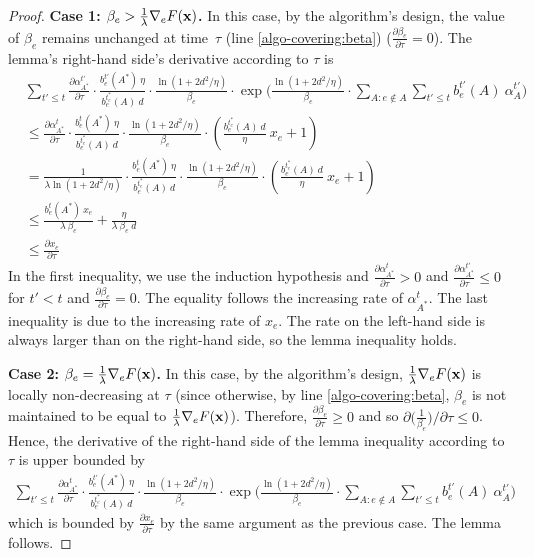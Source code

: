 \begin{proof}
	\textbf{Case 1: $\beta_{e} > \frac{1}{\lambda} \nabla_{e} F(\mathbf{x})$.}
	In this case, by the algorithm's design, the value of $\beta_{e}$ remains unchanged at time~$\tau$ (line \ref{algo-covering:beta}) ($\frac{\partial \beta_{e}}{\partial \tau} = 0$).
	The lemma's right-hand side's derivative according to $\tau$ is
	\begin{align*}
	&\sum_{t' \le t} \frac{\partial \alpha^{t'}_{A^{*}}}{\partial \tau} \cdot
		\frac{b^{t'}_{e}(A^{*}) \ \eta }{b^{t_{e}^{*}}_{e}(A) \ d} \cdot \frac{\ln(1+2d^{2}/\eta)}{\beta_{e}}
			\cdot \exp\biggl( \frac{\ln(1+2d^{2}/\eta)}{\beta_{e} } \cdot \sum_{A: e \notin A} \sum_{t' \le t} b^{t'}_{e}(A)\ \alpha^{t'}_{A} \biggr) \\
	&\leq \frac{\partial \alpha^{t}_{A^{*}}}{\partial \tau} \cdot
		\frac{b^{t}_{e}(A^{*}) \ \eta }{b^{t_{e}^{*}}_{e}(A) \ d} \cdot \frac{\ln(1+2d^{2}/\eta)}{\beta_{e}} \cdot \left( \frac{b^{t_{e}^{*}}_{e}(A) \ d}{\eta}\ x_{e} + 1 \right) \\
	&= \frac{1}{\lambda \ln(1+2d^{2}/\eta)} \cdot
		\frac{b^{t}_{e}(A^{*}) \ \eta }{b^{t_{e}^{*}}_{e}(A) \ d} \cdot \frac{\ln(1+2d^{2}/\eta)}{\beta_{e}} \cdot \left( \frac{b^{t_{e}^{*}}_{e}(A) \ d}{\eta}\ x_{e} + 1 \right) \\
	&\leq  \frac{b^{t}_{e}(A^{*}) \ x_{e}}{\lambda\ \beta_{e}} + \frac{\eta}{\lambda\ \beta_{e}\ d} \\
	&\leq \frac{\partial x_{e}}{\partial \tau}
	\end{align*}
	In the first inequality, we use the induction hypothesis and $\frac{\partial \alpha^{t}_{A^{*}}}{\partial \tau} > 0$
	and $\frac{\partial \alpha^{t'}_{A^{*}}}{\partial \tau} \leq 0$ for $t' < t$ and $\frac{\partial \beta_{e}}{\partial \tau} = 0$.
	The equality follows the increasing rate of $\alpha^{t}_{A^{*}}$.
	The last inequality is due to the increasing rate of $x_{e}$.
	The rate on the left-hand side is always larger than on the right-hand side, so the lemma inequality holds.

	\textbf{Case 2: $\beta_{e} = \frac{1}{\lambda} \nabla_{e} F(\mathbf{x})$.}
	In this case, by the algorithm's design, $\frac{1}{\lambda} \nabla_{e} F(\mathbf{x})$ is locally non-decreasing at $\tau$ (since otherwise,
	by line \ref{algo-covering:beta}, $\beta_{e}$ is not maintained to be equal to $\frac{1}{\lambda} \nabla_{e} F(\mathbf{x})$).
	Therefore, $\frac{\partial \beta_{e}}{\partial \tau} \geq 0$ and so $\partial \bigl(\frac{1}{\beta_{e}}\bigr)/\partial \tau \leq 0$.
	Hence, the derivative of the right-hand side of the lemma inequality according to $\tau$ is upper bounded by
	\begin{align*}
	\sum_{t' \le t} \frac{\partial \alpha^{t}_{A^{*}}}{\partial \tau} \cdot
		\frac{b^{t'}_{e}(A^{*}) \ \eta}{b^{t_{e}^{*}}_{e}(A) \ d} \cdot \frac{\ln(1+2d^{2}/\eta)}{\beta_{e}}
			\cdot \exp\biggl( \frac{\ln(1+2d^{2}/\eta)}{\beta_{e} } \cdot \sum_{A: e \notin A} \sum_{t' \le t} b^{t'}_{e}(A)\ \alpha^{t'}_{A} \biggr)
	\end{align*}
	which is bounded by $\frac{\partial x_{e}}{\partial \tau}$ by the same argument as the previous case. The lemma follows.
\end{proof}

